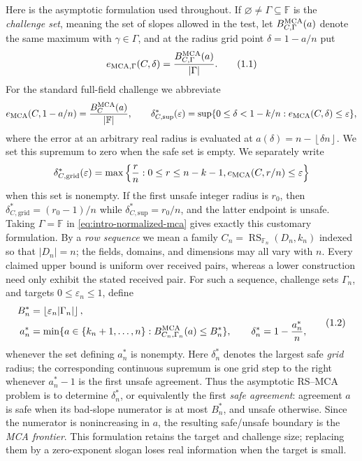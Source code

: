 \documentclass[11pt,a4paper]{amsart}
\numberwithin{equation}{section}
\theoremstyle{remark}
\DeclareMathOperator{\RS}{RS}
\newcommand{\F}{\mathbb F}
\newcommand{\eps}{\varepsilon}
\newcommand{\abs}[1]{\lvert #1\rvert}
\newcommand{\floor}[1]{\left\lfloor #1\right\rfloor}
\begin{document}
Here is the asymptotic formulation used throughout.  If
\(\varnothing\ne\Gamma\subseteq\F\) is the \emph{challenge set}, meaning
the set of slopes allowed in the test, let
\(B_{C,\Gamma}^{\rm MCA}(a)\) denote the same maximum with
\(\gamma\in\Gamma\), and at the radius grid point \(\delta=1-a/n\) put
\[
 e_{\rm MCA,\Gamma}(C,\delta)
   =\frac{B_{C,\Gamma}^{\rm MCA}(a)}{\abs\Gamma}.
 \tag{1.1}\label{eq:intro-normalized-mca}
\]
For the standard full-field challenge we abbreviate
\[
 e_{\rm MCA}(C,1-a/n)=\frac{B_C^{\rm MCA}(a)}{\abs\F},
 \qquad
 \delta_{C,\mathrm{sup}}^*(\eps)=
 \sup\{0\le\delta<1-k/n:e_{\rm MCA}(C,\delta)\le\eps\},
\]
where the error at an arbitrary real radius is evaluated at
\(a(\delta)=n-\floor{\delta n}\).  We set this supremum to zero when the
safe set is empty.  We separately write
\[
 \delta_{C,\mathrm{grid}}^*(\eps)=
 \max\left\{\frac rn:0\le r\le n-k-1,
       e_{\rm MCA}(C,r/n)\le\eps\right\}
\]
when this set is nonempty.  If the first unsafe integer radius is \(r_0\),
then
\(\delta_{C,\mathrm{grid}}^*=(r_0-1)/n\) while
\(\delta_{C,\mathrm{sup}}^*=r_0/n\), and the latter endpoint is unsafe.
Taking
\(\Gamma=\F\) in \eqref{eq:intro-normalized-mca} gives exactly this
customary formulation.
By a \emph{row sequence} we mean a family
\(C_n=\RS_{\F_n}(D_n,k_n)\) indexed so that \(\abs{D_n}=n\); the fields,
domains, and dimensions may all vary with \(n\).  Every claimed upper
bound is uniform over received pairs, whereas a lower construction need
only exhibit the stated received pair.  For such a sequence,
challenge sets
\(\Gamma_n\), and targets \(0\le\eps_n\le1\), define
\[
 \begin{split}
 B_n^*&=\floor{\eps_n\abs{\Gamma_n}},\\
 a_n^*&=\min\{a\in\{k_n+1,\ldots,n\}:
              B_{C_n,\Gamma_n}^{\rm MCA}(a)\le B_n^*\},
 \qquad
 \delta_n^*=1-\frac{a_n^*}{n},
 \end{split}
 \tag{1.2}\label{eq:intro-asymptotic-threshold}
\]
whenever the set defining \(a_n^*\) is nonempty.  Here \(\delta_n^*\)
denotes the largest safe \emph{grid} radius; the corresponding continuous
supremum is one grid step to the right whenever \(a_n^*-1\) is the first
unsafe agreement.  Thus the asymptotic RS--MCA problem is to determine
\(\delta_n^*\), or equivalently the first
\emph{safe agreement}: agreement \(a\) is safe when its bad-slope
numerator is at most \(B_n^*\), and unsafe otherwise.  Since the numerator
is nonincreasing in \(a\), the resulting safe/unsafe boundary is the
\emph{MCA frontier}.  This formulation retains the target and challenge
size; replacing them by a zero-exponent slogan loses real information when
the target is small.
\end{document}
